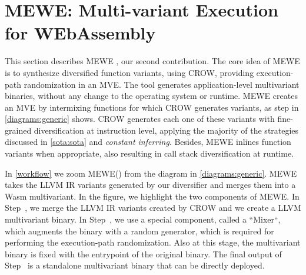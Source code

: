 \section{MEWE: Multi-variant Execution for WEbAssembly}
\label{section:mewe}

\newcommand{\tool}{MEWE\xspace}
\newcommand{\repourl}{TODO}
This section describes MEWE \cite{MEWE}, our second contribution. 
The core idea of \tool is to synthesize diversified function variants, using CROW, providing execution-path randomization in an MVE.
The tool generates application-level multivariant binaries, without any change to the operating system or \wasm runtime.
MEWE creates an MVE by intermixing functions for which CROW generates variants, as step  in \autoref{diagrams:generic} shows.
CROW generates each one of these variants with fine-grained diversification at instruction level, applying the majority of the strategies discussed in \autoref{sota:sota} and \emph{constant inferring}. Besides, \tool inlines function variants when appropriate, also resulting in call stack diversification at runtime.

In \autoref{workflow} we zoom MEWE() from the diagram in \autoref{diagrams:generic}. MEWE takes the LLVM IR variants generated by our diversifier and merges them into a Wasm multivariant.
In the figure, we highlight the two components of MEWE. 
In Step~, we merge the LLVM IR variants created by CROW and we create a LLVM multivariant binary.
In Step~, we use a special component, called a ``Mixer``,  which augments the binary with a random generator, which is required for performing the execution-path randomization. 
Also at this stage, the multivariant binary is fixed with the entrypoint of the original binary.
The final output of Step~ is a standalone multivariant \wasm binary that can be directly deployed. 

